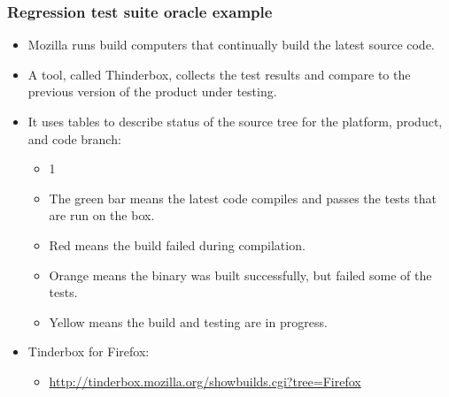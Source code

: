\begin{frame}[hasprev=false, hasnext=false]
\label{example:mozilla-firefox-regression-test-suite-oracle}
\frametitle{Regression test suite oracle example}

\begin{itemize}
	\item Mozilla runs build computers that continually build the latest source
	code.

	\item A tool, called Thinderbox, collects the test results and compare to
	the previous version of the product under testing.

	\item It uses tables to describe status of the source tree for the
	platform, product, and code branch:
	\begin{itemize}
	\item 1
		\item The green bar means the latest code compiles and passes the tests
		that are run on the box.
		\item Red means the build failed during compilation.
		\item Orange means the binary was built successfully, but failed some
		of the tests.
		\item Yellow means the build and testing are in progress.
	\end{itemize}

	\item Tinderbox for Firefox:
	\begin{itemize}
		\item \url{http://tinderbox.mozilla.org/showbuilds.cgi?tree=Firefox}
	\end{itemize}
\end{itemize}
\end{frame}